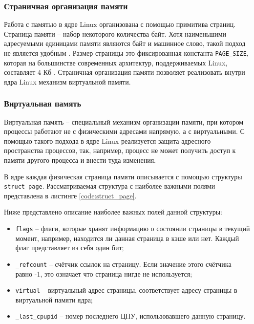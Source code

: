 \subsubsection{Страничная организация памяти}

Работа с памятью в ядре Linux организована с помощью примитива страниц. Страница памяти -- набор некоторого количества байт. Хотя наименьшими адресуемыми единицами памяти являются байт и машинное слово, такой подход не является удобным \cite{kernel-development}. Размер страницы это фиксированная константа \texttt{PAGE\_SIZE}, которая на большинстве современных архитектур, поддерживаемых Linux, составляет 4 Кб \cite{4kb-page-size}. Страничная организация памяти позволяет реализовать внутри ядра Linux механизм виртуальной памяти.

\subsubsection{Виртуальная память}

Виртуальная память -- специальный механизм организации памяти, при котором процессы работают не с физическими адресами напрямую, а с виртуальными. С помощью такого подхода в ядре Linux реализуется защита адресного пространства процессов, так, например, процесс не может получить доступ к памяти другого процесса и внести туда изменения.

В ядре каждая физическая страница памяти описывается с помощью структуры \texttt{struct page}. Рассматриваемая структура с наиболее важными полями представлена в листинге \ref{code:struct_page}.

\newpage


Ниже представлено описание наиболее важных полей данной структуры:

\begin{itemize}
	\item \texttt{flags} -- флаги, которые хранят информацию о состоянии страницы в текущий момент, например, находится ли данная страница в кэше или нет. Каждый флаг представляет из себя один бит;
	\item \texttt{\_refcount} -- счётчик ссылок на страницу. Если значение этого счётчика равно -1, это означает что страница нигде не используется;
	\item \texttt{virtual} -- виртуальный адрес страницы, соответствует адресу страницы в виртуальной памяти ядра;
	\item \texttt{\_last\_cpupid} -- номер последнего ЦПУ, использовавшего данную страницу.
\end{itemize}

